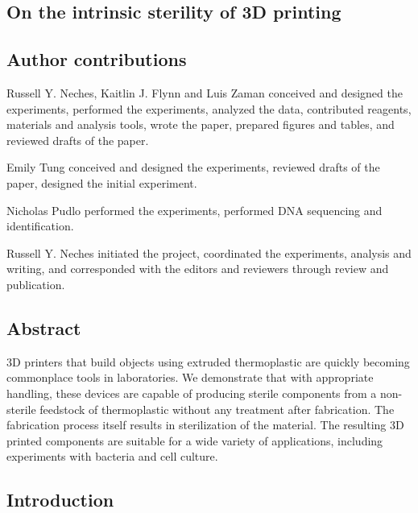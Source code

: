 \begin{refsection}

\chapter{On the intrinsic sterility of 3D printing}



\section{Author contributions}

Russell Y. Neches, Kaitlin J. Flynn and Luis Zaman conceived and
designed the experiments, performed the experiments, analyzed the
data, contributed reagents, materials and analysis tools, wrote the paper,
prepared figures and tables, and reviewed drafts of the paper.

Emily Tung conceived and designed the experiments, reviewed drafts of
the paper, designed the initial experiment.

Nicholas Pudlo performed the experiments, performed DNA sequencing and
identification.

Russell Y. Neches initiated the project, coordinated the experiments,
analysis and writing, and corresponded with the editors and reviewers
through review and publication.

\section{Abstract} 

3D printers that build objects using extruded thermoplastic are
quickly becoming commonplace tools in laboratories. We demonstrate
that with appropriate handling, these devices are capable of producing
sterile components from a non-sterile feedstock of thermoplastic
without any treatment after fabrication. The fabrication process
itself results in sterilization of the material. The resulting 3D
printed components are suitable for a wide variety of applications,
including experiments with bacteria and cell culture.

\section{Introduction}


\end{refsection}
